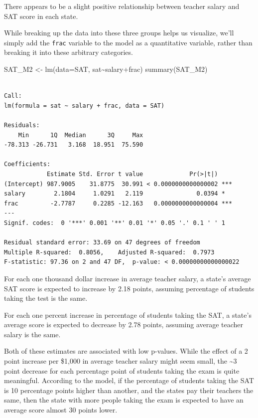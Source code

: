 \documentclass[
  letterpaper,
  DIV=11,
  numbers=noendperiod]{scrreprt}
\newenvironment{Shaded}{\begin{snugshade}}{\end{snugshade}}
\newcommand{\AttributeTok}[1]{\textcolor[rgb]{0.40,0.45,0.13}{#1}}
\newcommand{\FunctionTok}[1]{\textcolor[rgb]{0.28,0.35,0.67}{#1}}
\newcommand{\NormalTok}[1]{\textcolor[rgb]{0.00,0.23,0.31}{#1}}
\newcommand{\OtherTok}[1]{\textcolor[rgb]{0.00,0.23,0.31}{#1}}
\newcommand{\SpecialCharTok}[1]{\textcolor[rgb]{0.37,0.37,0.37}{#1}}
\begin{document}
There appears to be a slight positive relationship between teacher
salary and SAT score in each state.

While breaking up the data into these three groups helps us visualize,
we'll simply add the \texttt{frac} variable to the model as a
quantitative variable, rather than breaking it into these arbitrary
categories.

\begin{Shaded}
\begin{Highlighting}[]
\NormalTok{SAT\_M2 }\OtherTok{\textless{}{-}} \FunctionTok{lm}\NormalTok{(}\AttributeTok{data=}\NormalTok{SAT, sat}\SpecialCharTok{\textasciitilde{}}\NormalTok{salary}\SpecialCharTok{+}\NormalTok{frac)}
\FunctionTok{summary}\NormalTok{(SAT\_M2)}
\end{Highlighting}
\end{Shaded}

\begin{verbatim}

Call:
lm(formula = sat ~ salary + frac, data = SAT)

Residuals:
    Min      1Q  Median      3Q     Max 
-78.313 -26.731   3.168  18.951  75.590 

Coefficients:
            Estimate Std. Error t value             Pr(>|t|)    
(Intercept) 987.9005    31.8775  30.991 < 0.0000000000000002 ***
salary        2.1804     1.0291   2.119               0.0394 *  
frac         -2.7787     0.2285 -12.163   0.0000000000000004 ***
---
Signif. codes:  0 '***' 0.001 '**' 0.01 '*' 0.05 '.' 0.1 ' ' 1

Residual standard error: 33.69 on 47 degrees of freedom
Multiple R-squared:  0.8056,    Adjusted R-squared:  0.7973 
F-statistic: 97.36 on 2 and 47 DF,  p-value: < 0.00000000000000022
\end{verbatim}

For each one thousand dollar increase in average teacher salary, a
state's average SAT score is expected to increase by 2.18 points,
assuming percentage of students taking the test is the same.

For each one percent increase in percentage of students taking the SAT,
a state's average score is expected to decrease by 2.78 points, assuming
average teacher salary is the same.

Both of these estimates are associated with low p-values. While the
effect of a 2 point increase per \$1,000 in average teacher salary might
seem small, the \textasciitilde3 point decrease for each percentage
point of students taking the exam is quite meaningful. According to the
model, if the percentage of students taking the SAT is 10 percentage
points higher than another, and the states pay their teachers the same,
then the state with more people taking the exam is expected to have an
average score almost 30 points lower.
\end{document}
